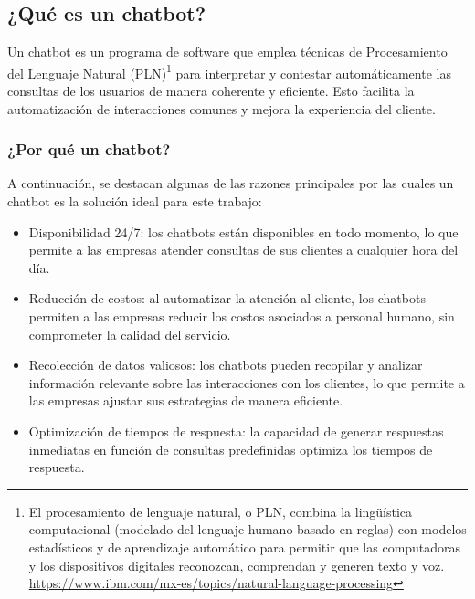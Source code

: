 \subsection{¿Qué es un chatbot?}

Un chatbot es un programa de software que emplea técnicas de Procesamiento del Lenguaje Natural (PLN)\footnote{El procesamiento de lenguaje natural, o PLN, combina la lingüística computacional (modelado del lenguaje humano basado en reglas) con modelos estadísticos y de aprendizaje automático para permitir que las computadoras y los dispositivos digitales reconozcan, comprendan y generen texto y voz. \url{https://www.ibm.com/mx-es/topics/natural-language-processing}} para interpretar y contestar automáticamente las consultas de los usuarios de manera coherente y eficiente. Esto facilita la automatización de interacciones comunes y mejora la experiencia del cliente.

\subsubsection{¿Por qué un chatbot?}

A continuación, se destacan algunas de las razones principales por las cuales un chatbot es la solución ideal para este trabajo:

\begin{itemize}
    \item Disponibilidad 24/7: los chatbots están disponibles en todo momento, lo que permite a las empresas atender consultas de sus clientes a cualquier hora del día.
    
    \item Reducción de costos: al automatizar la atención al cliente, los chatbots permiten a las empresas reducir los costos asociados a personal humano, sin comprometer la calidad del servicio.
    
    \item Recolección de datos valiosos: los chatbots pueden recopilar y analizar información relevante sobre las interacciones con los clientes, lo que permite a las empresas ajustar sus estrategias de manera eficiente.
    
    \item Optimización de tiempos de respuesta: la capacidad de generar respuestas inmediatas en función de consultas predefinidas optimiza los tiempos de respuesta.
\end{itemize}


